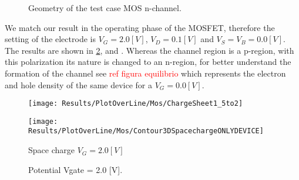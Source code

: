 \vspace{1cm}

\begin{figure}[!h]
\centering
{}
\hspace{1cm}
\hspace{0.5cm}
\caption{Geometry of the test case MOS n-channel.}
\label{fig: mos geometry}
\end{figure}


We match our result in the operating phase of the MOSFET, therefore the setting of the electrode is $V_G=2.0[V]$, $V_D=0.1[V]$ and $V_S=V_B=0.0[V]$. The results are shown in \ref{fig: potential mos},  and . Whereas the channel region is a p-region, with this polarization its nature is changed to an n-region, for better understand the formation of the channel see \textcolor{red}{ref figura equilibrio} which represents the electron and hole density of the same device for a $V_G=0.0[V]$.

\begin{figure}[!h]
\centering
{}

\end{figure}


\begin{figure}[!h]
\centering
\texttt{[image: Results/PlotOverLine/Mos/ChargeSheet1\_5to2]}
\end{figure}

\begin{figure}[!h]
\centering
\texttt{[image: Results/PlotOverLine/Mos/Contour3DSpacechargeONLYDEVICE]}
\caption{Space charge $V_G=2.0[V]$}
\end{figure}



\clearpage

\begin{figure}[!h]
\centering
{}
\hspace{0.5cm}
\hspace{0.5cm}
\caption{Potential Vgate = 2.0 [V].}
\label{fig: potential mos}
\end{figure}


